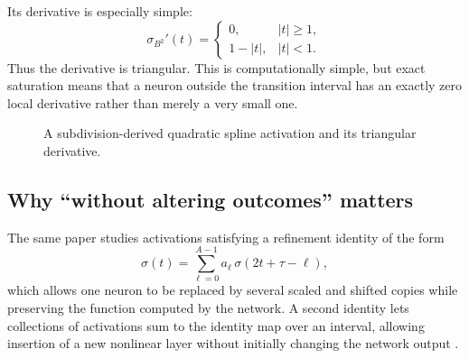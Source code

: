 \documentclass[11pt]{article}
\begin{document}
Its derivative is especially simple:
\begin{equation}
\sigma_{B^2}'(t)=
\begin{cases}
0, & |t|\ge1,\\[3pt]
1-|t|, & |t|<1.
\end{cases}
\label{eq:splinederiv}
\end{equation}
Thus the derivative is triangular.  This is computationally simple, but exact saturation means that a neuron outside the transition interval has an exactly zero local derivative rather than merely a very small one.

\begin{figure}[htbp]
\centering
{}
\caption{A subdivision-derived quadratic spline activation and its triangular derivative.}
\label{fig:spline}
\end{figure}

\subsection{Why ``without altering outcomes'' matters}

The same paper studies activations satisfying a refinement identity of the form
\begin{equation}
  \sigma(t)=\sum_{\ell=0}^{A-1} a_\ell\,\sigma(2t+\tau-\ell),
\end{equation}
which allows one neuron to be replaced by several scaled and shifted copies while preserving the function computed by the network.  A second identity lets collections of activations sum to the identity map over an interval, allowing insertion of a new nonlinear layer without initially changing the network output \cite{lopezurena2024}.
\end{document}
